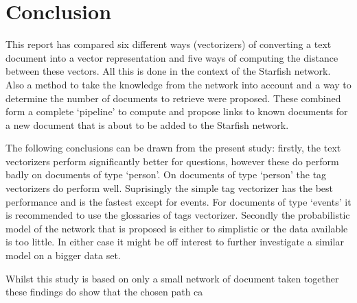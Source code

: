 \section{Conclusion}
This report has compared six different ways (vectorizers) of converting a text
document into a vector representation and five ways of computing the distance
between these vectors. All this is done in the context of the Starfish network.
Also a method to take the knowledge from the network into account and a way to
determine the number of documents to retrieve were proposed. These combined
form a complete `pipeline' to compute and propose links to known documents for
a new document that is about to be added to the Starfish network.

The following conclusions can be drawn from the present study: firstly, the
text vectorizers perform significantly better for questions, however these do
perform badly on documents of type `person'. On documents of type `person' the
tag vectorizers do perform well. Suprisingly the simple tag vectorizer has the
best performance and is the fastest except for events. For documents of type
`events' it is recommended to use the glossaries of tags vectorizer.  Secondly
the probabilistic model of the network that is proposed is either to simplistic
or the data available is too little. In either case it might be off interest to
further investigate a similar model on a bigger data set.


Whilst this study is based on only a small network of document taken together
these findings do show that the chosen path ca


